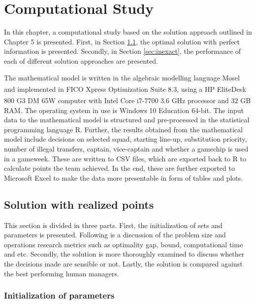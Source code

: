 
\chapter{Computational Study}


In this chapter, a computational study based on the solution approach outlined in Chapter 5 is presented. First, in Section \ref{sec:exact}, the optimal solution with perfect information is presented. Secondly, in Section \ref{sec:inexact}, the performance of each of different solution approaches are presented. 

\newpar

The mathematical model is written in the algebraic modelling language Mosel and implemented in FICO\textsuperscript {\textregistered} Xpress Optimization Suite 8.3, using a HP EliteDesk 800 G3 DM 65W computer with Intel\textsuperscript{\textregistered} Core\textsuperscript{\texttrademark} i7-7700 3.6 GHz processor and 32 GB RAM. The operating system in use is Windows 10 Education 64-bit. The input data to the mathematical model is structured and pre-processed in the statistical programming language R. Further, the results obtained from the mathematical model include decisions on selected squad, starting line-up, substitution priority, number of illegal transfers, captain, vice-captain and whether a gamechip is used in a gameweek. These are written to CSV files, which are exported back to R to calculate points the team achieved. In the end, these are further exported to Microsoft Excel to make the data more presentable in form of tables and plots. 

\section{Solution with realized points}\label{sec:exact}
This section is divided in three parts. 
First, the initialization of sets and parameters is presented. Following is a discussion of the problem size and operations research metrics such as optimality gap, bound, computational time and etc. Secondly, the solution is more thoroughly examined to discuss whether the decisions made are sensible or not. Lastly, the solution is compared against the best performing human managers. 



\subsection{Initialization of parameters}    

